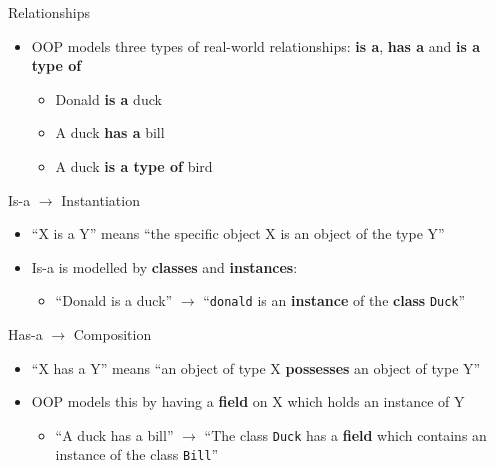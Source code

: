 \begin{frame}{Relationships}
\begin{itemize}
	\pause\item OOP models three types of real-world relationships: \textbf{is a}, \textbf{has a} and \textbf{is a type of}
	\begin{itemize}
		\pause\item Donald \textbf{is a} duck
		\pause\item A duck \textbf{has a} bill
		\pause\item A duck \textbf{is a type of} bird
	\end{itemize}
\end{itemize}
\end{frame}

\begin{frame}{Is-a $\to$ Instantiation}
\begin{itemize}
	\pause\item ``X is a Y'' means ``the specific object X is an object of the type Y''
	\pause\item Is-a is modelled by \textbf{classes} and \textbf{instances}:
	\begin{itemize}
		\pause\item ``Donald is a duck'' 
			$\to$ ``\lstinline{donald} is an \textbf{instance} of the \textbf{class} \lstinline{Duck}''
	\end{itemize}
\end{itemize}
\end{frame}

\begin{frame}{Has-a $\to$ Composition}
\begin{itemize}
	\pause\item ``X has a Y'' means ``an object of type X \textbf{possesses} an object of type Y''
	\pause\item OOP models this by having a \textbf{field} on X which holds an instance of Y
	\begin{itemize}
		\pause\item ``A duck has a bill''
			$\to$ ``The class \lstinline{Duck} has a \textbf{field} which contains an instance of the class \lstinline{Bill}''
	\end{itemize}
\end{itemize}
\end{frame}

